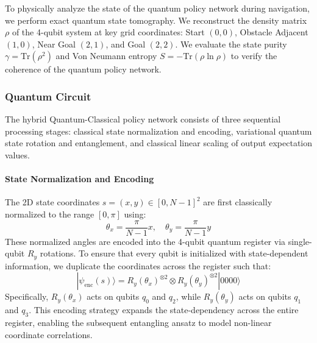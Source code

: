 \documentclass[12pt, a4paper]{article}
\begin{document}
To physically analyze the state of the quantum policy network during navigation, we perform exact quantum state tomography. We reconstruct the density matrix $\rho$ of the 4-qubit system at key grid coordinates: Start $(0,0)$, Obstacle Adjacent $(1,0)$, Near Goal $(2,1)$, and Goal $(2,2)$. We evaluate the state purity $\gamma = \text{Tr}(\rho^2)$ and Von Neumann entropy $S = -\text{Tr}(\rho \ln \rho)$ to verify the coherence of the quantum policy network.

\subsubsection{Quantum Circuit}

The hybrid Quantum-Classical policy network consists of three sequential processing stages: classical state normalization and encoding, variational quantum state rotation and entanglement, and classical linear scaling of output expectation values. 

\paragraph{State Normalization and Encoding}
The 2D state coordinates $s = (x, y) \in [0, N-1]^2$ are first classically normalized to the range $[0, \pi]$ using:
\begin{equation}
    \theta_x = \frac{\pi}{N-1} x, \quad \theta_y = \frac{\pi}{N-1} y
\end{equation}
These normalized angles are encoded into the 4-qubit quantum register via single-qubit $R_y$ rotations. To ensure that every qubit is initialized with state-dependent information, we duplicate the coordinates across the register such that:
\begin{equation}
    |\psi_{\text{enc}}(s)\rangle = R_y(\theta_x)^{\otimes 2} \otimes R_y(\theta_y)^{\otimes 2} |0000\rangle
\end{equation}
Specifically, $R_y(\theta_x)$ acts on qubits $q_0$ and $q_2$, while $R_y(\theta_y)$ acts on qubits $q_1$ and $q_3$. This encoding strategy expands the state-dependency across the entire register, enabling the subsequent entangling ansatz to model non-linear coordinate correlations.
\end{document}

